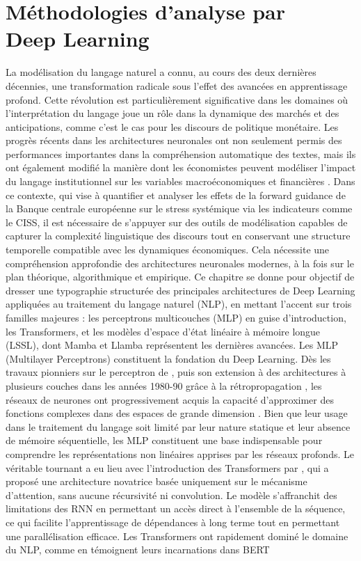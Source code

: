 \chapter{Méthodologies d'analyse par\\ Deep Learning}
\minitoc

La modélisation du langage naturel a connu, au cours des deux dernières décennies, une transformation radicale sous l’effet des avancées en apprentissage profond. Cette révolution est particulièrement significative dans les domaines où l’interprétation du langage joue un rôle dans la dynamique des marchés et des anticipations, comme c’est le cas pour les discours de politique monétaire. Les progrès récents dans les architectures neuronales ont non seulement permis des performances importantes dans la compréhension automatique des textes, mais ils ont également modifié la manière dont les économistes peuvent modéliser l’impact du langage institutionnel sur les variables macroéconomiques et financières \citep{vaswani2017attention, devlin2018bert}. Dans ce contexte, qui vise à quantifier et analyser les effets de la forward guidance de la Banque centrale européenne sur le stress systémique via les indicateurs comme le CISS, il est nécessaire de s’appuyer sur des outils de modélisation capables de capturer la complexité linguistique des discours tout en conservant une structure temporelle compatible avec les dynamiques économiques. Cela nécessite une compréhension approfondie des architectures neuronales modernes, à la fois sur le plan théorique, algorithmique et empirique. Ce chapitre se donne pour objectif de dresser une typographie structurée des principales architectures de Deep Learning appliquées au traitement du langage naturel (NLP), en mettant l’accent sur trois familles majeures : les perceptrons multicouches (MLP) en guise d'introduction, les Transformers, et les modèles d’espace d’état linéaire à mémoire longue (LSSL), dont Mamba et Llamba représentent les dernières avancées. Les MLP (Multilayer Perceptrons) constituent la fondation du Deep Learning. Dès les travaux pionniers sur le perceptron de \citep{rosenblatt1957perceptron}, puis son extension à des architectures à plusieurs couches dans les années 1980-90 grâce à la rétropropagation \citep{rumelhart1986learning, lecun1998gradient}, les réseaux de neurones ont progressivement acquis la capacité d’approximer des fonctions complexes dans des espaces de grande dimension \citep{cybenko1989approximation}. Bien que leur usage dans le traitement du langage soit limité par leur nature statique et leur absence de mémoire séquentielle, les MLP constituent une base indispensable pour comprendre les représentations non linéaires apprises par les réseaux profonds. Le véritable tournant a eu lieu avec l’introduction des Transformers par \citep{vaswani2017attention}, qui a proposé une architecture novatrice basée uniquement sur le mécanisme d’attention, sans aucune récursivité ni convolution. Le modèle s’affranchit des limitations des RNN en permettant un accès direct à l’ensemble de la séquence, ce qui facilite l’apprentissage de dépendances à long terme tout en permettant une parallélisation efficace. Les Transformers ont rapidement dominé le domaine du NLP, comme en témoignent leurs incarnations dans BERT 